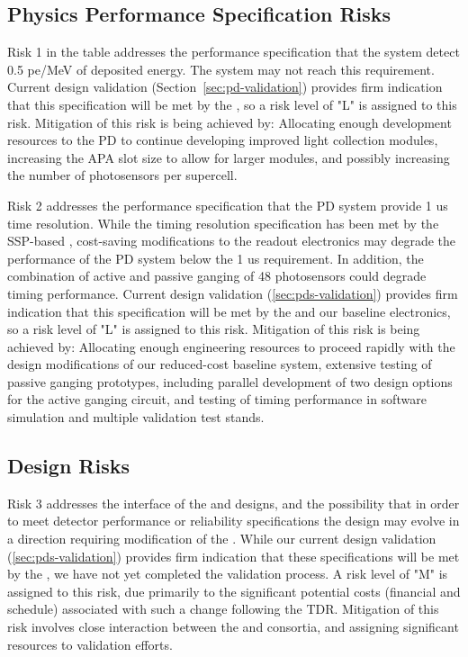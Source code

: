 \subsection{Physics Performance Specification Risks}

Risk 1 in the table addresses the performance specification that the  system detect 0.5 pe/MeV of deposited energy.  The system may not reach this requirement.  Current design validation (Section~\ref{sec:pd-validation}) 
 provides firm indication that this specification will be met by the , so a risk level of "L" is assigned to this risk.  Mitigation of this risk is being achieved by:  Allocating enough development resources to the PD to continue developing improved light collection modules, increasing the APA slot size to allow for larger modules, and possibly increasing the number of photosensors per  supercell.

Risk 2 addresses the performance specification that the PD system provide 1 us time resolution.  While the timing resolution specification has been met by the  SSP-based ,  cost-saving modifications to the readout electronics may degrade the performance of the PD system below the 1 us requirement.  In addition, the combination of active and passive ganging of 48 photosensors could degrade timing performance.  Current design validation (\ref{sec:pds-validation}) provides firm indication that this specification will be met by the  and our baseline electronics, so a risk level of "L" is assigned to this risk.  Mitigation of this risk is being achieved by:  Allocating enough engineering resources to proceed rapidly with the design modifications of our reduced-cost baseline system, extensive testing of passive ganging prototypes, including parallel development of two design options for the active ganging circuit, and testing of timing performance in software simulation and multiple validation test stands.


\subsection{Design Risks}

Risk 3 addresses the interface of the  and  designs, and the possibility that in order to meet detector performance or reliability specifications the  design may evolve in a direction requiring modification of the .  While our current design validation (\ref{sec:pds-validation}) provides firm indication that these specifications will be met by the , we have not yet completed the validation process.  A risk level of "M" is assigned to this risk, due primarily to the significant potential costs (financial and schedule) associated with such a change following the TDR.  Mitigation of this risk involves close interaction between the  and  consortia, and assigning significant resources to  validation efforts.

